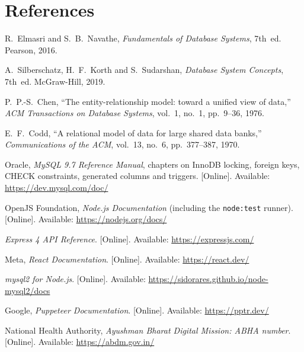\chapter*{References}
\begin{enumerate}[label={[\arabic*]}, leftmargin=2em]
\item R.~Elmasri and S.~B.~Navathe, \emph{Fundamentals of Database Systems}, 7th~ed. Pearson, 2016.
\item A.~Silberschatz, H.~F.~Korth and S.~Sudarshan, \emph{Database System Concepts}, 7th~ed. McGraw-Hill, 2019.
\item P.~P.-S.~Chen, ``The entity-relationship model: toward a unified view of data,'' \emph{ACM Transactions on Database Systems}, vol.~1, no.~1, pp.~9--36, 1976.
\item E.~F.~Codd, ``A relational model of data for large shared data banks,'' \emph{Communications of the ACM}, vol.~13, no.~6, pp.~377--387, 1970.
\item Oracle, \emph{MySQL 9.7 Reference Manual}, chapters on InnoDB locking, foreign keys, CHECK constraints, generated columns and triggers. [Online]. Available: \url{https://dev.mysql.com/doc/}
\item OpenJS Foundation, \emph{Node.js Documentation} (including the \texttt{node:test} runner). [Online]. Available: \url{https://nodejs.org/docs/}
\item \emph{Express 4 API Reference}. [Online]. Available: \url{https://expressjs.com/}
\item Meta, \emph{React Documentation}. [Online]. Available: \url{https://react.dev/}
\item \emph{mysql2 for Node.js}. [Online]. Available: \url{https://sidorares.github.io/node-mysql2/docs}
\item Google, \emph{Puppeteer Documentation}. [Online]. Available: \url{https://pptr.dev/}
\item National Health Authority, \emph{Ayushman Bharat Digital Mission: ABHA number}. [Online]. Available: \url{https://abdm.gov.in/}
\end{enumerate}

